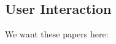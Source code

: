 \subsection{User Interaction} \label{sec:user_interaction}
We want these papers here: \citet{Tellex2014-uc, Kaupp2008-yr, Yanco2004-fh, Sweet2016-dw, Freedy2007-sg, Walter2015-tl, Ahmed2012-yn, Kaupp2005-pk, Tse2015-tz}
